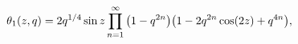 \[\mathop{\theta_{1}\/}\nolimits\!\left(z,q\right)=2q^{1/4}\mathop{\sin\/}%
\nolimits z\prod\limits_{n=1}^{\infty}{\left(1-q^{2n}\right)}{\left(1-2q^{2n}%
\mathop{\cos\/}\nolimits\!\left(2z\right)+q^{4n}\right)},\]